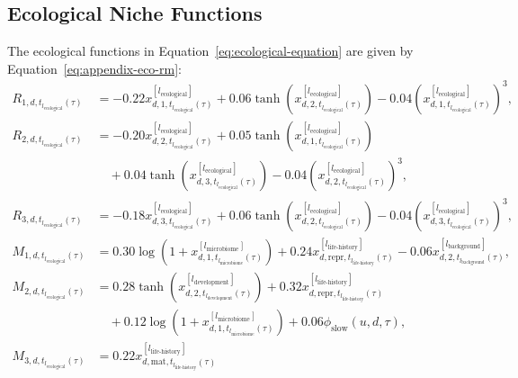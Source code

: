 \documentclass[11pt]{article}
\begin{document}
\subsection{Ecological Niche Functions}
The ecological functions in Equation~\ref{eq:ecological-equation} are given by Equation~\ref{eq:appendix-eco-rm}:
\begin{equation}
\begin{aligned}
R_{1,d,t_{l_{\mathrm{ecological}}}(\tau)}
&=
-0.22x^{[l_{\mathrm{ecological}}]}_{d,1,t_{l_{\mathrm{ecological}}}(\tau)}
+0.06\tanh\!\left(
x^{[l_{\mathrm{ecological}}]}_{d,2,t_{l_{\mathrm{ecological}}}(\tau)}
\right)
-0.04\left(
x^{[l_{\mathrm{ecological}}]}_{d,1,t_{l_{\mathrm{ecological}}}(\tau)}
\right)^3,\\
R_{2,d,t_{l_{\mathrm{ecological}}}(\tau)}
&=
-0.20x^{[l_{\mathrm{ecological}}]}_{d,2,t_{l_{\mathrm{ecological}}}(\tau)}
+0.05\tanh\!\left(
x^{[l_{\mathrm{ecological}}]}_{d,1,t_{l_{\mathrm{ecological}}}(\tau)}
\right)\\
&\quad+
0.04\tanh\!\left(
x^{[l_{\mathrm{ecological}}]}_{d,3,t_{l_{\mathrm{ecological}}}(\tau)}
\right)
-0.04\left(
x^{[l_{\mathrm{ecological}}]}_{d,2,t_{l_{\mathrm{ecological}}}(\tau)}
\right)^3,\\
R_{3,d,t_{l_{\mathrm{ecological}}}(\tau)}
&=
-0.18x^{[l_{\mathrm{ecological}}]}_{d,3,t_{l_{\mathrm{ecological}}}(\tau)}
+0.06\tanh\!\left(
x^{[l_{\mathrm{ecological}}]}_{d,2,t_{l_{\mathrm{ecological}}}(\tau)}
\right)
-0.04\left(
x^{[l_{\mathrm{ecological}}]}_{d,3,t_{l_{\mathrm{ecological}}}(\tau)}
\right)^3,\\
M_{1,d,t_{l_{\mathrm{ecological}}}(\tau)}
&=
0.30\log\!\left(
1+x^{[l_{\mathrm{microbiome}}]}_{d,1,t_{l_{\mathrm{microbiome}}}(\tau)}
\right)
+0.24x^{[l_{\mathrm{life\text{-}history}}]}_{d,\mathrm{repr},t_{l_{\mathrm{life\text{-}history}}}(\tau)}
-0.06x^{[l_{\mathrm{background}}]}_{d,2,t_{l_{\mathrm{background}}}(\tau)},\\
M_{2,d,t_{l_{\mathrm{ecological}}}(\tau)}
&=
0.28\tanh\!\left(
x^{[l_{\mathrm{development}}]}_{d,2,t_{l_{\mathrm{development}}}(\tau)}
\right)
+0.32x^{[l_{\mathrm{life\text{-}history}}]}_{d,\mathrm{repr},t_{l_{\mathrm{life\text{-}history}}}(\tau)}\\
&\quad+
0.12\log\!\left(
1+x^{[l_{\mathrm{microbiome}}]}_{d,1,t_{l_{\mathrm{microbiome}}}(\tau)}
\right)
+0.06\phi_{\mathrm{slow}}(u,d,\tau),\\
M_{3,d,t_{l_{\mathrm{ecological}}}(\tau)}
&=
0.22x^{[l_{\mathrm{life\text{-}history}}]}_{d,\mathrm{mat},t_{l_{\mathrm{life\text{-}history}}}(\tau)}

\end{aligned}
\end{equation}
\end{document}
